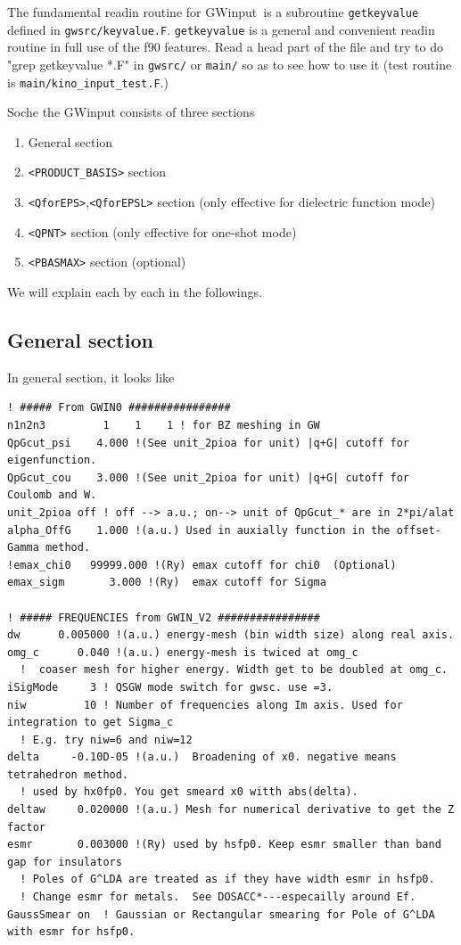 \documentclass[a4paper,10pt,epsf,fleqn]{article}
\newcommand{\fx}[1]{\subsection{\sf #1\index{\sf #1}}}
\newcommand{\GWinput}{{\sf GWinput}\ }
\begin{document}
{The fundamental readin routine for \GWinput is a subroutine 
\verb#getkeyvalue# defined in \verb#gwsrc/keyvalue.F#.
\verb#getkeyvalue# is a general and convenient readin routine in full use of the f90 features.
Read a head part of the file and try to do "grep getkeyvalue *.F" 
in \verb#gwsrc/# or \verb#main/# so as to see how to use it
(test routine is \verb#main/kino_input_test.F#.)

Soche the {\sf GWinput} consists of three sections \\
\begin{enumerate}
 \item General section 
 \item \verb#<PRODUCT_BASIS># section
 \item \verb#<QforEPS>#,\verb#<QforEPSL># section (only effective for
dielectric function mode)
 \item \verb#<QPNT># section (only effective for one-shot mode)
 \item \verb#<PBASMAX># section (optional)
\end{enumerate}
We will explain each by each in the followings.

\newpage
\fx{General section}
In general section, it looks like
\begin{verbatim}
! ##### From GWIN0 ################ 
n1n2n3         1    1    1 ! for BZ meshing in GW 
QpGcut_psi    4.000 !(See unit_2pioa for unit) |q+G| cutoff for eigenfunction.
QpGcut_cou    3.000 !(See unit_2pioa for unit) |q+G| cutoff for Coulomb and W.
unit_2pioa off ! off --> a.u.; on--> unit of QpGcut_* are in 2*pi/alat 
alpha_OffG    1.000 !(a.u.) Used in auxially function in the offset-Gamma method.
!emax_chi0   99999.000 !(Ry) emax cutoff for chi0  (Optional)
emax_sigm       3.000 !(Ry)  emax cutoff for Sigma

! ##### FREQUENCIES from GWIN_V2 ################ 
dw      0.005000 !(a.u.) energy-mesh (bin width size) along real axis.
omg_c      0.040 !(a.u.) energy-mesh is twiced at omg_c
  !  coaser mesh for higher energy. Width get to be doubled at omg_c.
iSigMode     3 ! QSGW mode switch for gwsc. use =3.
niw         10 ! Number of frequencies along Im axis. Used for integration to get Sigma_c
  ! E.g. try niw=6 and niw=12
delta     -0.10D-05 !(a.u.)  Broadening of x0. negative means tetrahedron method.
  ! used by hx0fp0. You get smeard x0 witth abs(delta).
deltaw     0.020000 !(a.u.) Mesh for numerical derivative to get the Z factor
esmr       0.003000 !(Ry) used by hsfp0. Keep esmr smaller than band gap for insulators
  ! Poles of G^LDA are treated as if they have width esmr in hsfp0. 
  ! Change esmr for metals.  See DOSACC*---especailly around Ef.
GaussSmear on  ! Gaussian or Rectangular smearing for Pole of G^LDA with esmr for hsfp0.
\end{verbatim}

}
\end{document}
